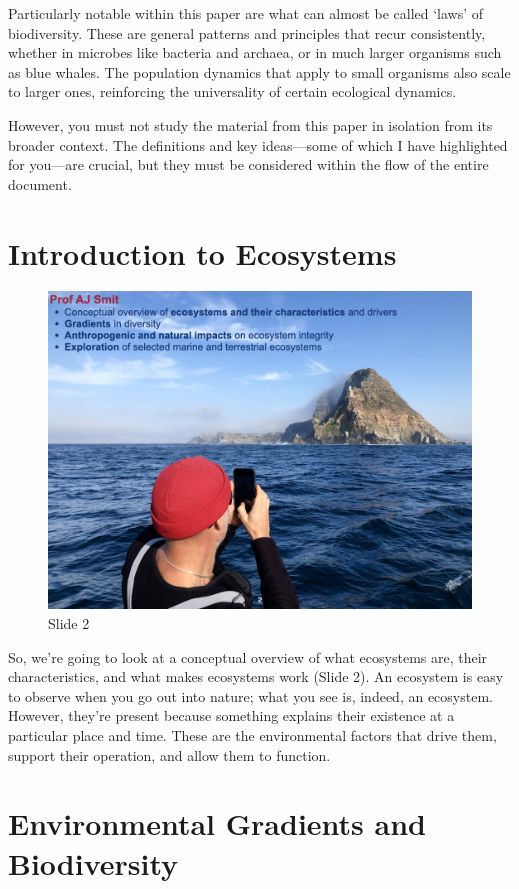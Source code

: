 \documentclass[
  10pt,
]{book}
\begin{document}
Particularly notable within this paper are what can almost be called
`laws' of biodiversity. These are general patterns and principles that
recur consistently, whether in microbes like bacteria and archaea, or in
much larger organisms such as blue whales. The population dynamics that
apply to small organisms also scale to larger ones, reinforcing the
universality of certain ecological dynamics.

However, you must not study the material from this paper in isolation
from its broader context. The definitions and key ideas---some of which
I have highlighted for you---are crucial, but they must be considered
within the flow of the entire document.

\section{Introduction to Ecosystems}\label{introduction-to-ecosystems}

\begin{figure}[ht]
\centering
\includegraphics[width=0.8\linewidth]{../images/BDC334/BDC334-002.jpeg}
\caption*{Slide 2}
\end{figure}

So, we're going to look at a conceptual overview of what ecosystems are,
their characteristics, and what makes ecosystems work (Slide 2). An
ecosystem is easy to observe when you go out into nature; what you see
is, indeed, an ecosystem. However, they're present because something
explains their existence at a particular place and time. These are the
environmental factors that drive them, support their operation, and
allow them to function.

\section{Environmental Gradients and
Biodiversity}\label{environmental-gradients-and-biodiversity}
\end{document}
